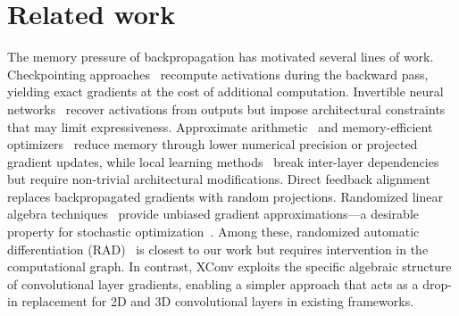 \documentclass[10pt]{article}
\begin{document}
\section{Related work}\label{related-work}
The memory pressure of backpropagation has motivated several lines of work. Checkpointing approaches~\citep{Griewank, ml-checkpoint, korthikanti2023reducing} recompute activations during the backward pass, yielding exact gradients at the cost of additional computation. Invertible neural networks~\citep{Haber_2017, jacobsen2018irevnet, hascoet2019reversible, OrozcoWitteLouboutinEtAl_2024} recover activations from outputs but impose architectural constraints that may limit expressiveness. Approximate arithmetic~\citep{Gupta-single, xi2023training4bit} and memory-efficient optimizers~\citep{zhao2024galore} reduce memory through lower numerical precision or projected gradient updates, while local learning methods~\citep{saikumar2024neuroflux} break inter-layer dependencies but require non-trivial architectural modifications. Direct feedback alignment~\citep{DFA1, han2019efficient, frenkel} replaces backpropagated gradients with random projections. Randomized linear algebra techniques~\citep{Avron, martinsson_tropp_2020, hutchpp} provide unbiased gradient approximations---a desirable property for stochastic optimization~\citep{neelakantan2015adding}. Among these, randomized automatic differentiation (RAD)~\citep{oktay2020randomized} is closest to our work but requires intervention in the computational graph. In contrast, XConv exploits the specific algebraic structure of convolutional layer gradients, enabling a simpler approach that acts as a drop-in replacement for 2D and 3D convolutional layers in existing frameworks.
\end{document}
